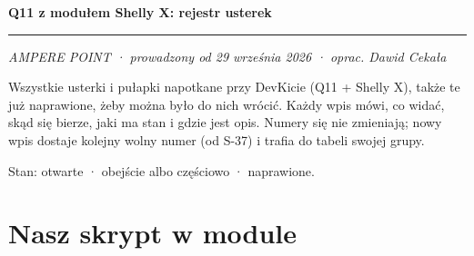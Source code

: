 \documentclass[11pt,a4paper]{article}
\begin{document}
{\LARGE\bfseries Q11 z modułem Shelly X: rejestr usterek\par}
\vspace{4pt}\textcolor{apteal}{\rule{\textwidth}{1.2pt}}

\emph{AMPERE POINT · prowadzony od 29 września 2026 · oprac. Dawid Cekała}


Wszystkie usterki i pułapki napotkane przy DevKicie (Q11 + Shelly X), także te już naprawione, żeby można było do nich wrócić. Każdy wpis mówi, co widać, skąd się bierze, jaki ma stan i gdzie jest opis. Numery się nie zmieniają; nowy wpis dostaje kolejny wolny numer (od S-37) i trafia do tabeli swojej grupy.


Stan:  otwarte ·  obejście albo częściowo ·  naprawione.


\section*{Nasz skrypt w module}
\end{document}
